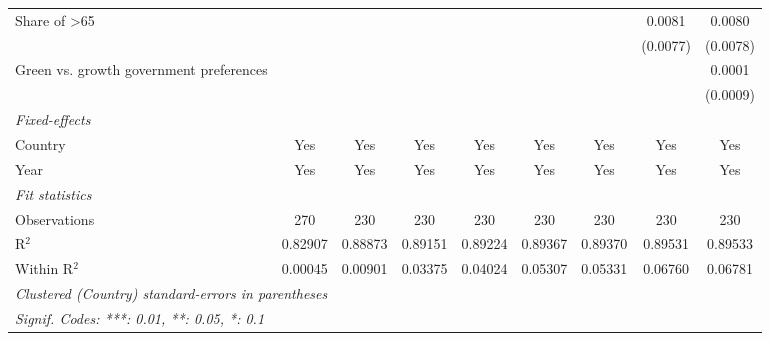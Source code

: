 \begin{table}[htbp]
\begin{tabular}{lcccccccc}
      Share of >65                            &          &          &          &          &          &          & 0.0081   & 0.0080\\   
                                              &          &          &          &          &          &          & (0.0077) & (0.0078)\\   
      Green vs. growth government preferences &          &          &          &          &          &          &          & 0.0001\\   
                                              &          &          &          &          &          &          &          & (0.0009)\\   
      \midrule
      \emph{Fixed-effects}\\
      Country                                 & Yes      & Yes      & Yes      & Yes      & Yes      & Yes      & Yes      & Yes\\  
      Year                                    & Yes      & Yes      & Yes      & Yes      & Yes      & Yes      & Yes      & Yes\\  
      \midrule
      \emph{Fit statistics}\\
      Observations                            & 270      & 230      & 230      & 230      & 230      & 230      & 230      & 230\\  
      R$^2$                                   & 0.82907  & 0.88873  & 0.89151  & 0.89224  & 0.89367  & 0.89370  & 0.89531  & 0.89533\\  
      Within R$^2$                            & 0.00045  & 0.00901  & 0.03375  & 0.04024  & 0.05307  & 0.05331  & 0.06760  & 0.06781\\  
      \midrule \midrule
      \multicolumn{9}{l}{\emph{Clustered (Country) standard-errors in parentheses}}\\
      \multicolumn{9}{l}{\emph{Signif. Codes: ***: 0.01, **: 0.05, *: 0.1}}\\
   \end{tabular}
\end{table}


